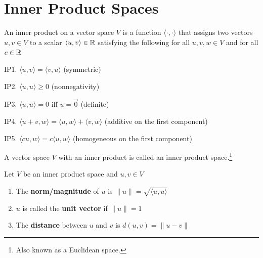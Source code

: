 \newpage
\section{Inner Product Spaces}
\begin{definition}
An inner product on a vector space $V$ is a function $\langle \cdot, \cdot \rangle$ that assigns two vectors $u, v \in V$ to a scalar $\langle u, v \rangle \in \mathbb{R}$ satisfying the following for all $u, v, w \in V$ and for all $c \in \mathbb{R}$

IP1. $\langle u, v \rangle = \langle v, u \rangle$ (symmetric)

IP2. $\langle u, u \rangle \geq 0$ (nonnegativity)

IP3. $\langle u, u \rangle = 0$ iff $u = \vec{0}$ (definite)

IP4. $\langle u + v, w \rangle = \langle u, w \rangle + \langle v, w \rangle$  (additive on the first component)

IP5. $\langle cu, w \rangle = c\langle u, w \rangle$ (homogeneous on the first component)
\end{definition}

\begin{remark}
A vector space $V$ with an inner product is called an inner product space.\footnote{Also known as a Euclidean space.}
\end{remark}

\begin{definition}
Let $V$ be an inner product space and $u, v \in V$
\begin{enumerate}
    \item The \textbf{norm/magnitude} of $u$ is $\lVert u \rVert = \sqrt{\langle u, u \rangle}$
    \item $u$ is called the \textbf{unit vector} if $\lVert u \rVert = 1$
    \item The \textbf{distance} between $u$ and $v$ is $d(u, v) = \lVert u - v \rVert$
\end{enumerate}
\end{definition}


